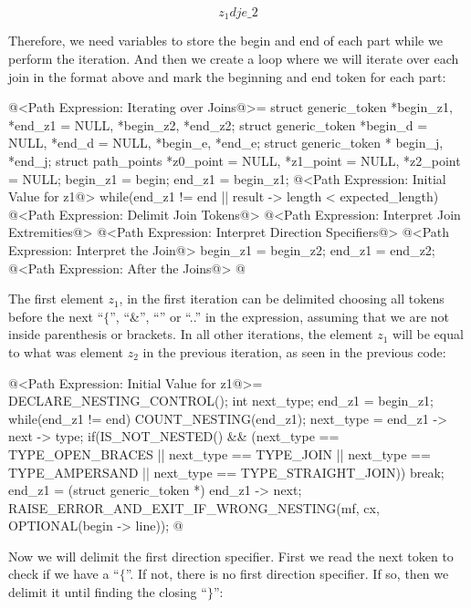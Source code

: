 $$
z_1{d} j {e}\_2
$$

Therefore, we need variables to store the begin and end of each part
while we perform the iteration. And then we create a loop where we
will iterate over each join in the format above and mark the beginning
and end token for each part:

\iniciocodigo
@<Path Expression: Iterating over Joins@>=
{
  struct generic_token *begin_z1, *end_z1 = NULL, *begin_z2, *end_z2;
  struct generic_token *begin_d = NULL, *end_d = NULL, *begin_e, *end_e;
  struct generic_token * begin_j, *end_j;
  struct path_points *z0_point = NULL, *z1_point = NULL, *z2_point = NULL;
  begin_z1 = begin;
  end_z1 = begin_z1;
  @<Path Expression: Initial Value for z1@>
  while(end_z1 != end || result -> length < expected_length){
    @<Path Expression: Delimit Join Tokens@>
    @<Path Expression: Interpret Join Extremities@>
    @<Path Expression: Interpret Direction Specifiers@>
    @<Path Expression: Interpret the Join@>
    begin_z1 = begin_z2;
    end_z1 = end_z2;
  }
  @<Path Expression: After the Joins@>
}
@
\fimcodigo

The first element $z_1$, in the first iteration can be delimited
choosing all tokens before the next ``$\{$'', ``\&'', ``\-\-'' or
``..'' in the expression, assuming that we are not inside parenthesis
or brackets. In all other iterations, the element $z_1$ will be equal
to what was element $z_2$ in the previous iteration, as seen in the
previous code:

\iniciocodigo
@<Path Expression: Initial Value for z1@>=
{
  DECLARE_NESTING_CONTROL();
  int next_type;
  end_z1 = begin_z1;
  while(end_z1 != end){
    COUNT_NESTING(end_z1);
    next_type = end_z1 -> next -> type;
    if(IS_NOT_NESTED() &&
       (next_type == TYPE_OPEN_BRACES || next_type == TYPE_JOIN ||
        next_type == TYPE_AMPERSAND || next_type == TYPE_STRAIGHT_JOIN))
      break;
    end_z1 = (struct generic_token *) end_z1 -> next;
  }
  RAISE_ERROR_AND_EXIT_IF_WRONG_NESTING(mf, cx, OPTIONAL(begin -> line));
}
@
\fimcodigo

Now we will delimit the first direction specifier. First we read the
next token to check if we have a ``$\{$''. If not, there is no first
direction specifier.  If so, then we delimit it until finding the
closing ``$\}$'':


